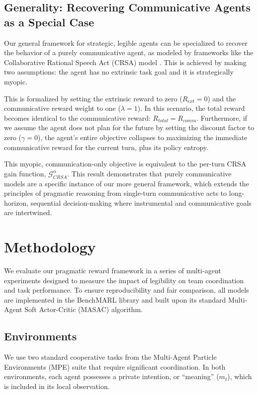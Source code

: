 \documentclass{article}
\begin{document}
\subsection{Generality: Recovering Communicative Agents as a Special Case}
\label{ssec:recover_crsa}

Our general framework for strategic, legible agents can be specialized to recover the behavior of a purely communicative agent, as modeled by frameworks like the Collaborative Rational Speech Act (CRSA) model \cite{estienne2025collaborative}. This is achieved by making two assumptions: the agent has no extrinsic task goal and it is strategically myopic.

This is formalized by setting the extrinsic reward to zero ($R_{ext}=0$) and the communicative reward weight to one ($\lambda=1$). In this scenario, the total reward becomes identical to the communicative reward: $R_{total} = R_{comm}$. Furthermore, if we assume the agent does not plan for the future by setting the discount factor to zero ($\gamma = 0$), the agent's entire objective collapses to maximizing the immediate communicative reward for the current turn, plus its policy entropy. 

This myopic, communication-only objective is equivalent to the per-turn CRSA gain function, $\mathcal{G}_{CRSA}^{\alpha}$. This result demonstrates that purely communicative models are a specific instance of our more general framework, which extends the principles of pragmatic reasoning from single-turn communicative acts to long-horizon, sequential decision-making where instrumental and communicative goals are intertwined.

\section{Methodology}
\label{sec:methodology}

We evaluate our pragmatic reward framework in a series of multi-agent experiments designed to measure the impact of legibility on team coordination and task performance. To ensure reproducibility and fair comparison, all models are implemented in the BenchMARL library and built upon its standard Multi-Agent Soft Actor-Critic (MASAC) algorithm.

\subsection{Environments}
\label{ssec:environments}

We use two standard cooperative tasks from the Multi-Agent Particle Environments (MPE) suite that require significant coordination. In both environments, each agent possesses a private intention, or ``meaning'' ($m_t$), which is included in its local observation.
\end{document}
